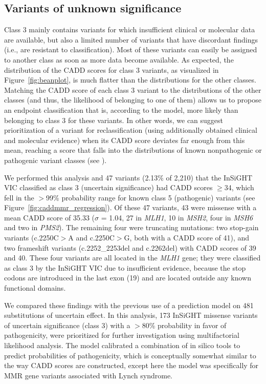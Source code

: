\subsection{Variants of unknown significance}
Class 3 mainly contains variants for which insufficient clinical or molecular data are available, but also a limited number of variants that have discordant findings (i.e., are resistant to classification).
Most of these variants can easily be assigned to another class as soon as more data become available.
As expected, the distribution of the CADD scores for class 3 variants, as visualized in Figure~\ref{fig:beanplot}, is much flatter than the distributions for the other classes.
Matching the CADD score of each class 3 variant to the distributions of the other classes (and thus, the likelihood of belonging to one of them) allows us to propose an endpoint classification that is, according to the model, more likely than belonging to class 3 for these variants.
In other words, we can suggest prioritization of a variant for reclassification (using additionally obtained clinical and molecular evidence) when its CADD score deviates far enough from this mean, reaching a score that falls into the distributions of known nonpathogenic or pathogenic variant classes (see \textsl{}).

We performed this analysis and 47 variants (2.13\% of 2,210) that the InSiGHT VIC classified as class 3 (uncertain significance) had CADD scores $\geq$34, which fell in the $>$99\% probability range for known class 5 (pathogenic) variants (see Figure~\ref{fig:caddmmr_regression}).
Of these 47 variants, 43 were missense with a mean CADD score of 35.33 ($\sigma$ = 1.04, 27 in \textit{MLH1}, 10 in \textit{MSH2}, four in \textit{MSH6} and two in \textit{PMS2}).
The remaining four were truncating mutations: two stop-gain variants (c.2250C$>$A and c.2250C$>$G, both with a CADD score of 41), and two frameshift variants (c.2252\_2253del and c.2262del) with CADD scores of 39 and 40.
These four variants are all located in the \textit{MLH1} gene; they were classified as class 3 by the InSiGHT VIC due to insufficient evidence, because the stop codons are introduced in the last exon (19) and are located outside any known functional domains.

We compared these findings with the previous use of a prediction model\cite{Thompson_2013b} on 481 substitutions\cite{Thompson_2013a} of uncertain effect.
In this analysis, 173 InSiGHT missense variants of uncertain significance (class 3) with a $>$80\% probability in favor of pathogenicity, were prioritized for further investigation using multifactorial likelihood analysis.
The model calibrated a combination of in silico tools to predict probabilities of pathogenicity, which is conceptually somewhat similar to the way CADD scores are constructed, except here the model was specifically for MMR gene variants associated with Lynch syndrome.

